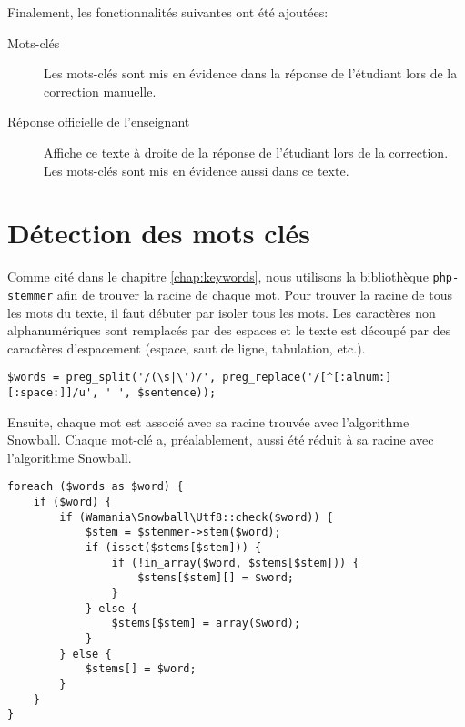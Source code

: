 Finalement, les fonctionnalités suivantes ont été ajoutées:

\begin{description}
  \item[Mots-clés]
  
  Les mots-clés sont mis en évidence dans la réponse de l'étudiant lors de la correction manuelle.

  \item[Réponse officielle de l'enseignant]
  
  Affiche ce texte à droite de la réponse de l'étudiant lors de la correction.
  Les mots-clés sont mis en évidence aussi dans ce texte.
\end{description}

\section{Détection des mots clés}

Comme cité dans le chapitre \autoref{chap:keywords}, nous utilisons la biblioth\`eque \texttt{php-stemmer} afin de trouver la racine de chaque mot.
Pour trouver la racine de tous les mots du texte, il faut débuter par isoler tous les mots.
Les caractères non alphanumériques sont remplacés par des espaces et le texte est découpé par des caractères d'espacement (espace, saut de ligne, tabulation, etc.).


\begin{lstfloat}
\begin{lstlisting}[frame=l]
$words = preg_split('/(\s|\')/', preg_replace('/[^[:alnum:][:space:]]/u', ' ', $sentence));
\end{lstlisting}
\caption{Isoler les mots du texte.}
\label{code:isoler}
\end{lstfloat}

Ensuite, chaque mot est associé avec sa racine trouvée avec l'algorithme Snowball.
Chaque mot-clé a, préalablement, aussi été réduit à sa racine avec l'algorithme Snowball.

\begin{lstfloat}
\begin{lstlisting}[frame=l]
foreach ($words as $word) {
	if ($word) {
		if (Wamania\Snowball\Utf8::check($word)) {
			$stem = $stemmer->stem($word);
			if (isset($stems[$stem])) {
				if (!in_array($word, $stems[$stem])) {
					$stems[$stem][] = $word;
				}
			} else {
				$stems[$stem] = array($word);
			}
		} else {
			$stems[] = $word;
		}
	}
}
\end{lstlisting}
\caption{Racination des mots avec Snowball.}
\label{code:racinationsnowball}
\end{lstfloat}

